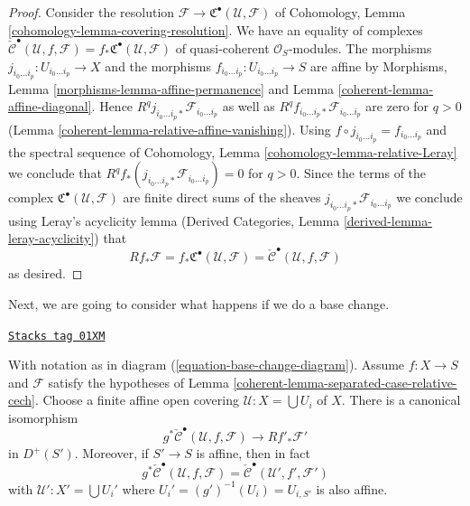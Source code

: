\begin{proof}

Consider the resolution
$\mathcal{F} \to {\mathfrak C}^\bullet(\mathcal{U}, \mathcal{F})$
of Cohomology, Lemma \ref{cohomology-lemma-covering-resolution}.
We have an equality of complexes
$\check{\mathcal{C}}^\bullet(\mathcal{U}, f, \mathcal{F}) =
f_*{\mathfrak C}^\bullet(\mathcal{U}, \mathcal{F})$
of quasi-coherent $\mathcal{O}_S$-modules.
The morphisms $j_{i_0 \ldots i_p} : U_{i_0 \ldots i_p} \to X$
and the morphisms $f_{i_0 \ldots i_p} : U_{i_0 \ldots i_p} \to S$
are affine by Morphisms, Lemma \ref{morphisms-lemma-affine-permanence}
and Lemma \ref{coherent-lemma-affine-diagonal}.
Hence $R^qj_{i_0 \ldots i_p *}\mathcal{F}_{i_0 \ldots i_p}$
as well as $R^qf_{i_0 \ldots i_p *}\mathcal{F}_{i_0 \ldots i_p}$
are zero for $q > 0$ (Lemma \ref{coherent-lemma-relative-affine-vanishing}).
Using $f \circ j_{i_0 \ldots i_p} = f_{i_0 \ldots i_p}$ and
the spectral sequence of
Cohomology, Lemma \ref{cohomology-lemma-relative-Leray}
we conclude that
$R^qf_*(j_{i_0 \ldots i_p *}\mathcal{F}_{i_0 \ldots i_p}) = 0$
for $q > 0$.
Since the terms of the complex
${\mathfrak C}^\bullet(\mathcal{U}, \mathcal{F})$ are finite direct
sums of the sheaves $j_{i_0 \ldots i_p *}\mathcal{F}_{i_0 \ldots i_p}$
we conclude using Leray's acyclicity lemma
(Derived Categories, Lemma \ref{derived-lemma-leray-acyclicity})
that
$$
Rf_* \mathcal{F} = f_*{\mathfrak C}^\bullet(\mathcal{U}, \mathcal{F}) =
\check{\mathcal{C}}^\bullet(\mathcal{U}, f, \mathcal{F})
$$
as desired.
\end{proof}

Next, we are going to consider what happens if we do a base change.

\begin{lemma}
\label{coherent-lemma-base-change-complex}
\href{https://stacks.math.columbia.edu/tag/01XM}{\texttt{Stacks tag 01XM}}

With notation as in diagram (\ref{equation-base-change-diagram}).
Assume $f : X \to S$ and $\mathcal{F}$ satisfy the hypotheses of
Lemma \ref{coherent-lemma-separated-case-relative-cech}. Choose a finite
affine open covering $\mathcal{U} : X = \bigcup U_i$ of $X$.
There is a canonical isomorphism
$$
g^*\check{\mathcal{C}}^\bullet(\mathcal{U}, f, \mathcal{F})
\longrightarrow
Rf'_*\mathcal{F}'
$$
in $D^{+}(S')$. Moreover, if $S' \to S$ is affine, then in fact
$$
g^*\check{\mathcal{C}}^\bullet(\mathcal{U}, f, \mathcal{F})
=
\check{\mathcal{C}}^\bullet(\mathcal{U}', f', \mathcal{F}')
$$
with $\mathcal{U}' : X' = \bigcup U_i'$ where
$U_i' = (g')^{-1}(U_i) = U_{i, S'}$ is also affine.
\end{lemma}

